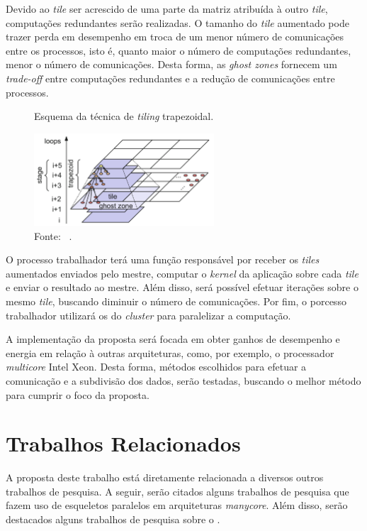 Devido ao \textit{tile} ser acrescido de uma parte da matriz atribuída à outro
\textit{tile}, computações redundantes serão realizadas. O tamanho do
\textit{tile} aumentado pode trazer perda em desempenho em troca de um menor
número de comunicações entre os processos, isto é, quanto maior o número de
computações redundantes, menor o número de comunicações. Desta forma, as \textit{ghost zones}
fornecem um \textit{trade-off} entre computações redundantes e a redução de
comunicações entre processos.

\begin{figure}[h]
	\centering
    \caption{Esquema da técnica de \textit{tiling} trapezoidal.}
    \includegraphics[width=0.6\textwidth]{figs/tiling.pdf}
    \caption*{Fonte: ~\cite{meng11}.}
    \label{fig:tiling}
\end{figure}



O processo trabalhador terá uma função responsável por receber os
\textit{tiles} aumentados enviados pelo mestre, computar o \textit{kernel} da aplicação
sobre cada \textit{tile} e enviar o resultado ao mestre.
Além disso, será possível efetuar iterações sobre o mesmo \textit{tile},
buscando diminuir o número de comunicações. Por fim, o porcesso trabalhador utilizará os \pes do
\textit{cluster} para paralelizar a computação.

A implementação da proposta será focada em obter ganhos de desempenho e energia
em relação à outras arquiteturas, como, por exemplo, o processador
\textit{multicore} Intel Xeon. Desta forma, métodos escolhidos para efetuar a
comunicação e a subdivisão dos dados, serão testadas, buscando o melhor método
para cumprir o foco da proposta.

\section{Trabalhos Relacionados}

A proposta deste trabalho está diretamente relacionada a diversos outros trabalhos de pesquisa.
A seguir, serão citados alguns trabalhos de pesquisa que fazem uso de esqueletos paralelos em
arquiteturas \textit{manycore}. Além disso, serão destacados alguns trabalhos de pesquisa sobre
o \mppa.


